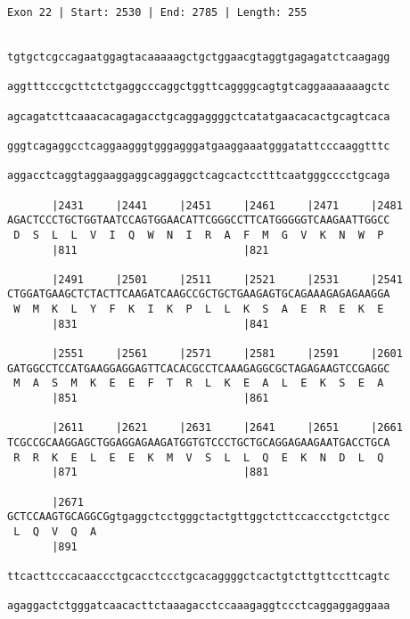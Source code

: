 \documentclass{article}
\begin{document}
\begin{Verbatim}
Exon 22 | Start: 2530 | End: 2785 | Length: 255


tgtgctcgccagaatggagtacaaaaagctgctggaacgtaggtgagagatctcaagagg
                                                            
aggtttcccgcttctctgaggcccaggctggttcaggggcagtgtcaggaaaaaaagctc
                                                            
agcagatcttcaaacacagagacctgcaggaggggctcatatgaacacactgcagtcaca
                                                            
gggtcagaggcctcaggaagggtgggagggatgaaggaaatgggatattcccaaggtttc
                                                            
aggacctcaggtaggaaggaggcaggaggctcagcactcctttcaatgggcccctgcaga
                                                            
       |2431     |2441     |2451     |2461     |2471     |2481
AGACTCCCTGCTGGTAATCCAGTGGAACATTCGGGCCTTCATGGGGGTCAAGAATTGGCC
 D  S  L  L  V  I  Q  W  N  I  R  A  F  M  G  V  K  N  W  P 
       |811                          |821                   
  
       |2491     |2501     |2511     |2521     |2531     |2541
CTGGATGAAGCTCTACTTCAAGATCAAGCCGCTGCTGAAGAGTGCAGAAAGAGAGAAGGA
 W  M  K  L  Y  F  K  I  K  P  L  L  K  S  A  E  R  E  K  E 
       |831                          |841                   
  
       |2551     |2561     |2571     |2581     |2591     |2601
GATGGCCTCCATGAAGGAGGAGTTCACACGCCTCAAAGAGGCGCTAGAGAAGTCCGAGGC
 M  A  S  M  K  E  E  F  T  R  L  K  E  A  L  E  K  S  E  A 
       |851                          |861                   
  
       |2611     |2621     |2631     |2641     |2651     |2661
TCGCCGCAAGGAGCTGGAGGAGAAGATGGTGTCCCTGCTGCAGGAGAAGAATGACCTGCA
 R  R  K  E  L  E  E  K  M  V  S  L  L  Q  E  K  N  D  L  Q 
       |871                          |881                   
  
       |2671                                                
GCTCCAAGTGCAGGCGgtgaggctcctgggctactgttggctcttccaccctgctctgcc
 L  Q  V  Q  A                                              
       |891                                                 
  
ttcacttcccacaaccctgcacctccctgcacaggggctcactgtcttgttccttcagtc
                                                            
agaggactctgggatcaacacttctaaagacctccaaagaggtccctcaggaggaggaaa
                                                            

\end{Verbatim}
\end{document}
